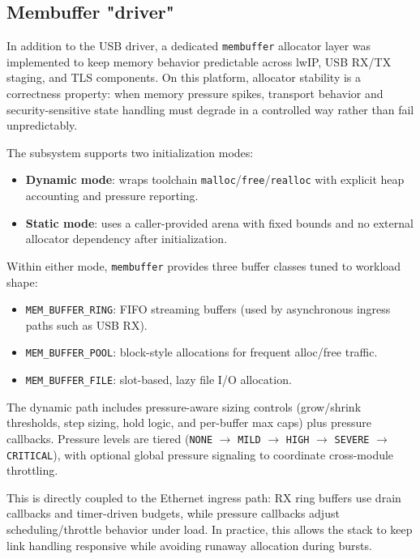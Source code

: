 \documentclass[titlepage]{report}
\begin{document}
	
		\subsection{Membuffer "driver"}
		In addition to the USB driver, a dedicated \texttt{membuffer} allocator layer was implemented to keep memory behavior predictable across lwIP, USB RX/TX staging, and TLS components. On this platform, allocator stability is a correctness property: when memory pressure spikes, transport behavior and security-sensitive state handling must degrade in a controlled way rather than fail unpredictably.

		The subsystem supports two initialization modes:
		\begin{itemize}
		 \item \textbf{Dynamic mode}: wraps toolchain \texttt{malloc}/\texttt{free}/\texttt{realloc} with explicit heap accounting and pressure reporting.
		\item \textbf{Static mode}: uses a caller-provided arena with fixed bounds and no external allocator dependency after initialization.
		\end{itemize}

		Within either mode, \texttt{membuffer} provides three buffer classes tuned to workload shape:
		\begin{itemize}
			\item \texttt{MEM\_BUFFER\_RING}: FIFO streaming buffers (used by asynchronous ingress paths such as USB RX).
			\item \texttt{MEM\_BUFFER\_POOL}: block-style allocations for frequent alloc/free traffic.
			\item \texttt{MEM\_BUFFER\_FILE}: slot-based, lazy file I/O allocation.
		\end{itemize}

		The dynamic path includes pressure-aware sizing controls (grow/shrink thresholds, step sizing, hold logic, and per-buffer max caps) plus pressure callbacks. Pressure levels are tiered (\texttt{NONE} $\rightarrow$ \texttt{MILD} $\rightarrow$ \texttt{HIGH} $\rightarrow$ \texttt{SEVERE} $\rightarrow$ \texttt{CRITICAL}), with optional global pressure signaling to coordinate cross-module throttling.

		This is directly coupled to the Ethernet ingress path: RX ring buffers use drain callbacks and timer-driven budgets, while pressure callbacks adjust scheduling/throttle behavior under load. In practice, this allows the stack to keep link handling responsive while avoiding runaway allocation during bursts.
\end{document}
